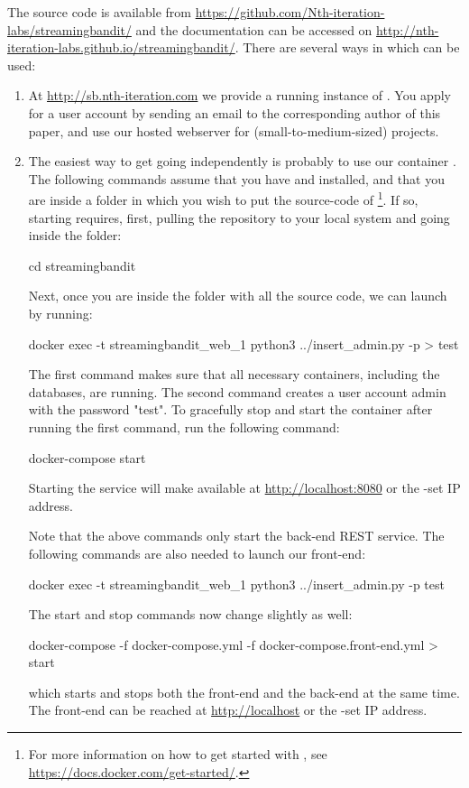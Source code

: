 \documentclass[nojss]{jss}
\begin{document}
The  source code is available  from
\url{https://github.com/Nth-iteration-labs/streamingbandit/} and the documentation can be accessed on \url{http://nth-iteration-labs.github.io/streamingbandit/}. There are several ways in which  can be used:
\begin{enumerate}
\item At \url{http://sb.nth-iteration.com} we provide a running instance of . You apply for a user account by sending an email to the corresponding author of this paper, and use our hosted webserver for (small-to-medium-sized) projects.
\item The easiest way to get going independently is probably to use our  container \citep{docker}. The following commands assume that you have  and  installed, and that you are inside a folder in which you wish to put the source-code of \footnote{For more information on how to get started with , see \url{https://docs.docker.com/get-started/}.}. If so, starting
 requires, first, pulling the repository to your local system and going inside the folder:
\begin{Code}
 cd streamingbandit
\end{Code}
Next, once you are inside the folder with all the source code, we can launch  by running:
\begin{Code} 
 docker exec -t streamingbandit_web_1 python3 ../insert_admin.py -p 
> test
\end{Code}
The first command makes sure that all necessary containers, including the databases, are running. The second command creates a user account admin with the password "test". To gracefully stop and start the container after running the first command, run the following command:
\begin{Code}
 docker-compose start
\end{Code}
Starting the service will make  available at \url{http://localhost:8080} or the -set IP address.

Note that the above commands only start the back-end REST service. The following commands are also needed to launch our front-end:
\begin{Code}
 docker exec -t streamingbandit_web_1 python3 ../insert_admin.py -p 
  test
\end{Code}
The start and stop commands now change slightly as well:
\begin{Code}
 docker-compose -f docker-compose.yml -f docker-compose.front-end.yml 
> start
\end{Code}
which starts and stops both the front-end and the back-end at the same time. The front-end can be reached at \url{http://localhost} or the -set IP address.


\end{enumerate}
\end{document}
